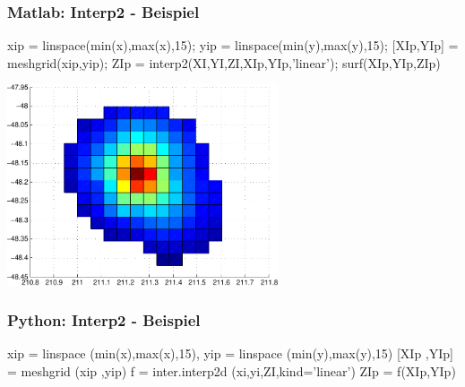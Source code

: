 \documentclass[hyperref={xetex}]{beamer}
\begin{document}
%
% 
\begin{frame}[fragile]\frametitle{Matlab: Interp2 - Beispiel}
\begin{matlabin}
xip = linspace(min(x),max(x),15); yip = linspace(min(y),max(y),15);
[XIp,YIp] = meshgrid(xip,yip);
ZIp = interp2(XI,YI,ZI,XIp,YIp,'linear');
surf(XIp,YIp,ZIp)
\end{matlabin}
\begin{center}
\includegraphics[width=0.6\textwidth]{figures/beispiel_interp2_plot}
\end{center}
\end{frame}

%
\begin{frame}[fragile]\frametitle{Python: Interp2 - Beispiel}
\begin{pyin}
xip = linspace (min(x),max(x),15), yip = linspace (min(y),max(y),15)
[XIp ,YIp] = meshgrid (xip ,yip)
f = inter.interp2d (xi,yi,ZI,kind='linear')  
ZIp = f(XIp,YIp)
\end{pyin}
\end{frame}
\end{document}
